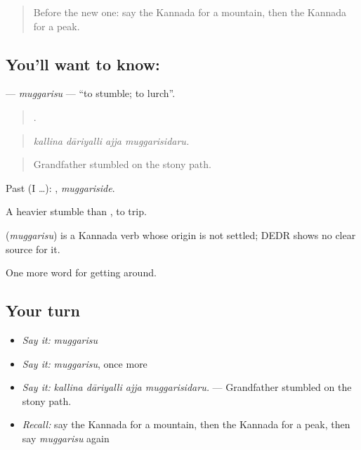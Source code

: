 \label{lesson:KA-C459-muggarisu}



\begin{quote}
Before the new one: say the Kannada for a mountain, then the Kannada for a peak.
\end{quote}

\subsection*{You'll want to know: }
\textbf{} — \emph{muggarisu} — \textquotedblleft{}to stumble; to lurch\textquotedblright{}.

\begin{quote}
   .
\end{quote}

\begin{quote}
\emph{kallina dāriyalli ajja muggarisidaru.}
\end{quote}

\begin{quote}
Grandfather stumbled on the stony path.
\end{quote}

Past (I …): , \emph{muggariside}.

A heavier stumble than , to trip.

\begin{cousinweb}
\textbf{} (\emph{muggarisu}) is a Kannada verb whose origin is not settled; DEDR shows no clear source for it.
\end{cousinweb}

\begin{grammarlens}[title={What you've built}]
One more word for getting around.
\end{grammarlens}

\subsection*{Your turn}
\begin{itemize}
\raggedright
  \item \emph{Say it:} \emph{muggarisu}
  \item \emph{Say it:} \emph{muggarisu}, once more
  \item \emph{Say it:} \emph{kallina dāriyalli ajja muggarisidaru.} — Grandfather stumbled on the stony path.
  \item \emph{Recall:} say the Kannada for a mountain, then the Kannada for a peak, then say \emph{muggarisu} again
\end{itemize}


